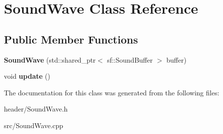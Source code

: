 \hypertarget{classSoundWave}{}\section{Sound\+Wave Class Reference}
\label{classSoundWave}
\subsection*{Public Member Functions}
\begin{DoxyCompactItemize}
\item 
{\bfseries Sound\+Wave} (std\+::shared\+\_\+ptr$<$ sf\+::\+Sound\+Buffer $>$ buffer)\hypertarget{classSoundWave_aa7dfd1fb154bdb2c3e8a2559cd2b2c7a}{}\label{classSoundWave_aa7dfd1fb154bdb2c3e8a2559cd2b2c7a}

\item 
void {\bfseries update} ()\hypertarget{classSoundWave_ae6315e23410f1e6da7db133e18521277}{}\label{classSoundWave_ae6315e23410f1e6da7db133e18521277}

\end{DoxyCompactItemize}


The documentation for this class was generated from the following files\+:\begin{DoxyCompactItemize}
\item 
header/Sound\+Wave.\+h\item 
src/Sound\+Wave.\+cpp\end{DoxyCompactItemize}
